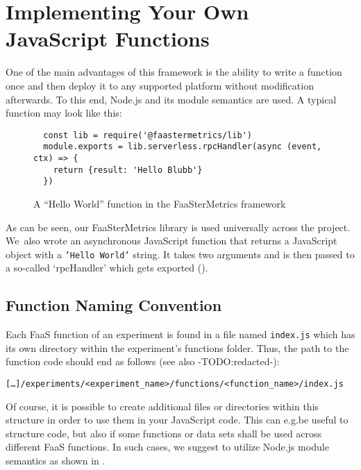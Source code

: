 \documentclass[../main.tex]{subfiles}
\begin{document}
\section{Implementing Your Own JavaScript Functions}\label{sec:jsFunctions}

One of the main advantages of this framework is the ability to write a function once 
and then deploy it to any supported platform without modification afterwards.
To this end, Node.js and its module semantics are used. A typical function may look like this:

\begin{figure}[H]
\begin{tcolorbox}
\begin{verbatim}
  const lib = require('@faastermetrics/lib')
  module.exports = lib.serverless.rpcHandler(async (event, ctx) => {
    return {result: 'Hello Blubb'}
  })
\end{verbatim}
\end{tcolorbox}
\caption{A ``Hello World'' function in the FaaSterMetrics framework}%
\label{fig:fmHelloWorld}
\end{figure}

As can be seen, our FaaSterMetrics library is used universally across the project. 
We~also wrote an asynchronous JavaScript function that returns a JavaScript object with a \texttt{'Hello World'} string. 
It takes two arguments and is then passed to a so-called `rpcHandler' which gets exported (). 

\newpage{}%
\subsection{Function Naming Convention}

Each FaaS function of an experiment is found in a file named \texttt{index.js} which has its own directory within the experiment's functions folder.
Thus, the path to the function code should end as follows (see also -TODO:\@ redacted-):%
\begin{tcolorbox}
  \texttt{[\ldots]/experiments/<experiment\_name>/functions/<function\_name>/index.js}
\end{tcolorbox}

Of course, it is possible to create additional files or directories within this structure in order to use them in your JavaScript code.
This can e.g.\@ be useful to structure code, but also if some functions or data sets shall be used across different FaaS functions.
In such cases, we suggest to utilize Node.js module semantics as shown in .
\end{document}
